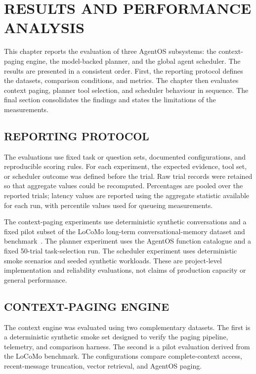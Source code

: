 \chapter{\uppercase{Results and Performance Analysis}}
\label{chap5}

This chapter reports the evaluation of three AgentOS subsystems: the context-paging engine, the model-backed planner, and the global agent scheduler. The results are presented in a consistent order. First, the reporting protocol defines the datasets, comparison conditions, and metrics. The chapter then evaluates context paging, planner tool selection, and scheduler behaviour in sequence. The final section consolidates the findings and states the limitations of the measurements.

\section{\uppercase{Reporting protocol}}

The evaluations use fixed task or question sets, documented configurations, and reproducible scoring rules. For each experiment, the expected evidence, tool set, or scheduler outcome was defined before the trial. Raw trial records were retained so that aggregate values could be recomputed. Percentages are pooled over the reported trials; latency values are reported using the aggregate statistic available for each run, with percentile values used for queueing measurements.

The context-paging experiments use deterministic synthetic conversations and a fixed pilot subset of the LoCoMo long-term conversational-memory dataset and benchmark~\cite{locomo2024}. The planner experiment uses the AgentOS function catalogue and a fixed 50-trial task-selection run. The scheduler experiment uses deterministic smoke scenarios and seeded synthetic workloads. These are project-level implementation and reliability evaluations, not claims of production capacity or general performance.

\section{\uppercase{Context-paging engine}}

The context engine was evaluated using two complementary datasets. The first is a deterministic synthetic smoke set designed to verify the paging pipeline, telemetry, and comparison harness. The second is a pilot evaluation derived from the LoCoMo benchmark. The configurations compare complete-context access, recent-message truncation, vector retrieval, and AgentOS paging.

